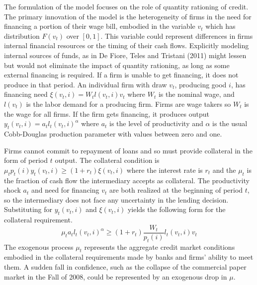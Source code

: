 \documentclass{article}
\begin{document}
The formulation of the model focuses on the role of quantity rationing of
credit. The primary innovation of the model is the heterogeneity of firms
in the need for financing a portion of their wage bill, embodied in the
variable $v_{t}$ which has distribution $F\left( v_{t}\right)$ over $\left[
0,1\right]$. This variable could represent differences in firms internal
financial resources or the timing of their cash flows. Explicitly modeling
internal sources of funds, as in De Fiore, Teles and Tristani (2011) might
lessen but would not eliminate the impact of quantity rationing, as long as
some external financing is required. If a firm is unable to get financing,
it does not produce in that period. An individual firm with draw $v_{t}$,
producing good $i$, has financing need $\xi \left( v_{t},i\right)
=W_{t}l\left( v_{t},i\right) v_{t}$ where $W_{t}$ is the nominal wage, and $%
l\left( v_{t}\right)$ is the labor demand for a producing firm. Firms are
wage takers so $W_{t}$ is the wage for all firms. If the firm gets
financing, it produces output $y_{t}\left( v_{t},i\right) =a_{t}l_{t}\left(
v_{t},i\right) ^{\alpha }$ where $a_{t}$ is the level of productivity and $%
\alpha$ is the usual Cobb-Douglas production parameter with values between
zero and one.

Firms cannot commit to repayment of loans and so must provide collateral in
the form of period $t$ output. The collateral condition is $\mu
_{t}p_{t}\left( i\right) y_{t}\left( v_{t},i\right) \geq \left(
1+r_{t}\right) \xi \left( v_{t},i\right)$ where the interest rate is $r_{t}$
and the $\mu _{t}$ is the fraction of cash flow the intermediary accepts as
collateral. The productivity shock $a_{t}$ and need for financing $v_{t}$
are both realized at the beginning of period $t$, so the intermediary does
not face any uncertainty in the lending decision. Substituting for $%
y_{t}\left( v_{t},i\right)$ and $\xi \left( v_{t},i\right)$ yields the
following form for the collateral requirement.
\begin{equation}
\mu _{t}a_{t}l_{t}\left( v_{t},i\right) ^{\alpha }\geq \left( 1+r_{t}\right)
\frac{W_{t}}{p_{t}\left( i\right) }l_{t}\left( v_{t},i\right) v_{t}
\label{collateral}
\end{equation}
The exogenous process $\mu _{t}$ represents the aggregate credit market
conditions embodied in the collateral requirements made by banks and firms'
ability to meet them. A sudden fall in confidence, such as the collapse of
the commercial paper market in the Fall of 2008, could be represented by an
exogenous drop in $\mu$.
\end{document}
